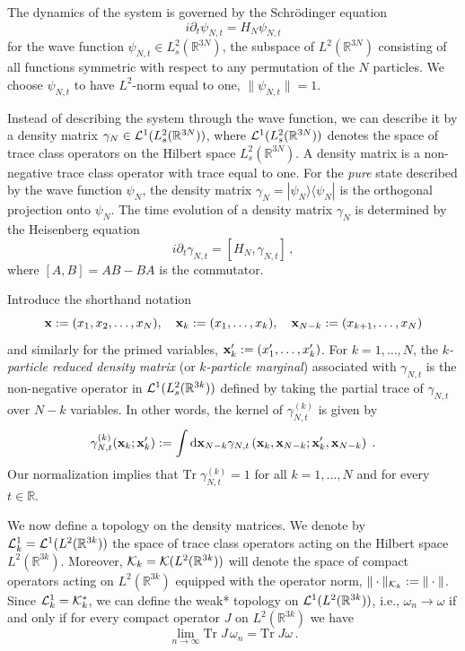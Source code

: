 \documentclass[11pt]{article}
\newcommand{\rd}{{\rm d}}
\newcommand{\bx}{{\bf x}}
\newcommand{\bR}{{\mathbb R}}
\newcommand{\tr}{\mbox{Tr}}
\newcommand{\cK}{{\cal K}}
\newcommand{\cL}{{\cal L}}
\begin{document}
The dynamics of the system is governed by the Schr\"odinger equation
\begin{equation}\label{eq:schr}
i\partial_t \psi_{N,t} =  H_N \psi_{N,t}
\end{equation}
for the wave function $\psi_{N,t} \in L^2_s (\bR^{3N})$, the
subspace of $L^2 (\bR^{3N})$ consisting of all functions symmetric
with respect to any permutation of the $N$ particles. We choose
$\psi_{N,t}$ to have $L^2$-norm equal to one, $\| \psi_{N,t}\| =1$.

Instead of describing the system through the wave function, we can
describe it by a density matrix $\gamma_{N} \in \cL^1 (L^2_s
(\bR^{3N}))$, where $\cL^1 (L^2_s (\bR^{3N}))$ denotes the space of
trace class operators on the Hilbert space $L^2_s (\bR^{3N})$. A
density matrix is a non-negative trace class operator with trace
equal to one. For the {\it pure} state described by the wave
function $\psi_{N}$, the density matrix $\gamma_{N} =|\psi_{N}
\rangle \langle \psi_{N}|$ is the orthogonal projection onto
$\psi_{N}$. The time evolution of a density matrix $\gamma_N$ is
determined by the Heisenberg equation
\begin{equation}\label{eq:heise}
i\partial_t \gamma_{N,t} = [ H_N , \gamma_{N,t}] \,,
\end{equation}
where $[A, B]= AB-BA$ is the commutator.

\medskip


Introduce the shorthand notation
$$
\bx:=(x_1, x_2, \ldots, x_N), \quad \bx_k:=(x_1, \ldots , x_k),
\quad \bx_{N-k}:=(x_{k+1}, \ldots , x_N)
$$
and similarly for the primed variables, $\bx'_k:=(x_1', \ldots ,
x_k')$. For $k =1,\dots ,N$, the {\it $k$-particle reduced density
matrix} (or {\it $k$-particle marginal}) associated with
$\gamma_{N,t}$ is the non-negative operator in $\cL^1 (L^2_s
(\bR^{3k}))$ defined by taking the partial trace of $\gamma_{N,t}$
over  $N-k$ variables. In other words, the kernel of
$\gamma_{N,t}^{(k)}$ is given by
\begin{equation}
\gamma_{N,t}^{(k)} (\bx_k; \bx_k'): = \int \rd \bx_{N-k}
\gamma_{N,t} \left( \bx_k, \bx_{N-k}; \bx_k', \bx_{N-k} \right) \; .
\label{eq:marginal}
\end{equation}
Our normalization implies that  \( \tr \; \gamma_{N,t}^{(k)} =1 \)
for all $k=1,\dots, N$ and for every $t \in \bR$.

We now define a topology on the density matrices. We denote by
$\cL^1_k = \cL^1 (L^2 (\bR^{3k}))$ the space of trace class
operators acting on the Hilbert space $L^2 (\bR^{3k})$. Moreover,
$\cK_k = \cK (L^2 (\bR^{3k}))$ will denote the space of compact
operators acting on $L^2 (\bR^{3k})$ equipped with the operator
norm, $\| \cdot \|_{\cK_k} := \| \cdot \|$. Since $\cL_k^1 =
\cK_k^*$, we can  define the weak* topology on
$\cL^1(L^2(\bR^{3k}))$, i.e., $\omega_{n} \to \omega$ if and only if
for every compact operator $J $ on $L^2 (\bR^{3k})$ we have
\begin{equation}
\lim_{n \to \infty}\tr \; J \, \omega_{n}  = \tr \; J \omega \, .
\end{equation}
\end{document}

